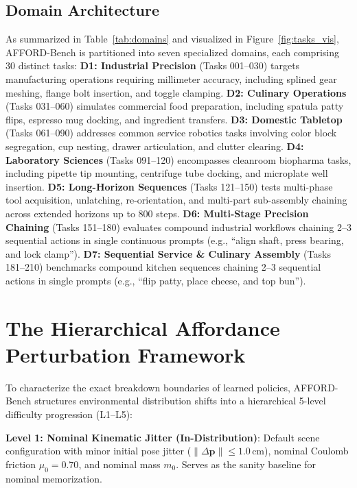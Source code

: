 \documentclass[conference]{IEEEtran}
\begin{document}
\subsection{Domain Architecture}
As summarized in Table~\ref{tab:domains} and visualized in Figure~\ref{fig:tasks_vis}, AFFORD-Bench is partitioned into seven specialized domains, each comprising 30 distinct tasks:
\textbf{D1: Industrial Precision} (Tasks 001--030) targets manufacturing operations requiring millimeter accuracy, including splined gear meshing, flange bolt insertion, and toggle clamping.
\textbf{D2: Culinary Operations} (Tasks 031--060) simulates commercial food preparation, including spatula patty flips, espresso mug docking, and ingredient transfers.
\textbf{D3: Domestic Tabletop} (Tasks 061--090) addresses common service robotics tasks involving color block segregation, cup nesting, drawer articulation, and clutter clearing.
\textbf{D4: Laboratory Sciences} (Tasks 091--120) encompasses cleanroom biopharma tasks, including pipette tip mounting, centrifuge tube docking, and microplate well insertion.
\textbf{D5: Long-Horizon Sequences} (Tasks 121--150) tests multi-phase tool acquisition, unlatching, re-orientation, and multi-part sub-assembly chaining across extended horizons up to 800 steps.
\textbf{D6: Multi-Stage Precision Chaining} (Tasks 151--180) evaluates compound industrial workflows chaining 2--3 sequential actions in single continuous prompts (e.g., ``align shaft, press bearing, and lock clamp'').
\textbf{D7: Sequential Service \& Culinary Assembly} (Tasks 181--210) benchmarks compound kitchen sequences chaining 2--3 sequential actions in single prompts (e.g., ``flip patty, place cheese, and top bun'').

\section{The Hierarchical Affordance Perturbation Framework}
\label{sec:perturbations}

To characterize the exact breakdown boundaries of learned policies, AFFORD-Bench structures environmental distribution shifts into a hierarchical 5-level difficulty progression (L1--L5):

\textbf{Level 1: Nominal Kinematic Jitter (In-Distribution)}: Default scene configuration with minor initial pose jitter ($\|\Delta \mathbf{p}\| \le 1.0\,\text{cm}$), nominal Coulomb friction $\mu_0 = 0.70$, and nominal mass $m_0$. Serves as the sanity baseline for nominal memorization.
\end{document}
